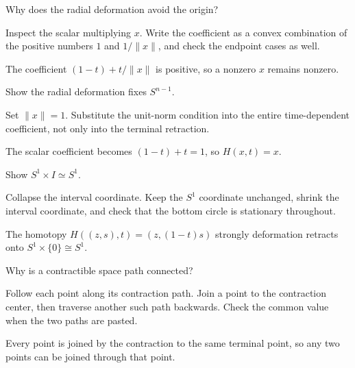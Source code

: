 \begin{exercise}\label{exr:viii02-14}
Why does the radial deformation avoid the origin?
\end{exercise}
\begin{hint}Inspect the scalar multiplying \(x\).
Write the coefficient as a convex combination of the positive numbers \(1\) and \(1/\|x\|\), and check the endpoint cases as well.
\end{hint}
\begin{solution}
The coefficient \((1-t)+t/\|x\|\) is positive, so a nonzero \(x\) remains nonzero.
\end{solution}

\begin{exercise}\label{exr:viii02-15}
Show the radial deformation fixes \(S^{n-1}\).
\end{exercise}
\begin{hint}Set \(\|x\|=1\).
Substitute the unit-norm condition into the entire time-dependent coefficient, not only into the terminal retraction.
\end{hint}
\begin{solution}
The scalar coefficient becomes \((1-t)+t=1\), so \(H(x,t)=x\).
\end{solution}

\begin{exercise}\label{exr:viii02-16}
Show \(S^1\times I\simeq S^1\).
\end{exercise}
\begin{hint}Collapse the interval coordinate.
Keep the \(S^1\) coordinate unchanged, shrink the interval coordinate, and check that the bottom circle is stationary throughout.
\end{hint}
\begin{solution}
The homotopy \(H((z,s),t)=(z,(1-t)s)\) strongly deformation retracts onto
\(S^1\times\{0\}\cong S^1\).
\end{solution}

\begin{exercise}\label{exr:viii02-17}
Why is a contractible space path connected?
\end{exercise}
\begin{hint}Follow each point along its contraction path.
Join a point to the contraction center, then traverse another such path backwards. Check the common value when the two paths are pasted.
\end{hint}
\begin{solution}
Every point is joined by the contraction to the same terminal point, so any two
points can be joined through that point.
\end{solution}

